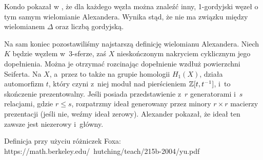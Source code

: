 
Kondo pokazał w \cite{kondo79}, że dla każdego węzła można znaleźć inny, 1-gordyjski węzeł o tym samym wielomianie Alexandera.
Wynika stąd, że nie ma związku między wielomianem $\Delta$ oraz liczbą gordyjską.

Na sam koniec pozostawiliśmy najstarszą definicję wielomianu Alexandera.
Niech $K$ będzie węzłem w~3-sferze, zaś $X$ nieskończonym nakryciem cyklicznym jego dopełnienia.
Można je otrzymać rozcinając dopełnienie wzdłuż powierzchni Seiferta.
Na $X$, a~przez to także na grupie homologii $H_1(X)$, działa automorfizm $t$, który czyni z~niej moduł nad pierścieniem $\mathbb Z[t, t^{-1}]$, i~to skończenie prezentowalny.
Jeśli posiada przedstawienie z~$r$ generatorami i~$s$ relacjami, gdzie $r \le s$, rozpatrzmy ideał generowany przez minory $r \times r$ macierzy prezentacji (jeśli nie, weźmy ideał zerowy).
Alexander pokazał, że ideał ten zawsze jest niezerowy i~główny.

\begin{tobedone}
    Definicja przy użyciu różniczek Foxa:
    https://math.berkeley.edu/~hutching/teach/215b-2004/yu.pdf
\end{tobedone}